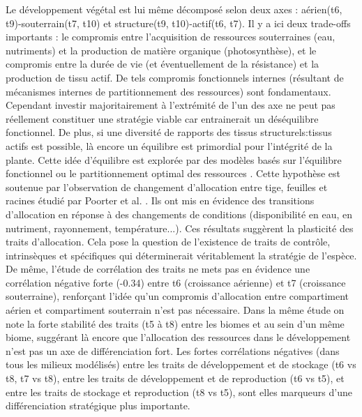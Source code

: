 \documentclass[french]{article}
\begin{document}
{Le développement végétal est lui même décomposé selon deux axes : aérien(t6, t9)-souterrain(t7, t10) et structure(t9, t10)-actif(t6, t7). Il y a ici deux trade-offs importants : le compromis entre l'acquisition de ressources souterraines (eau, nutriments) et la production de matière organique (photosynthèse), et le compromis entre la durée de vie (et éventuellement de la résistance) et la production de tissu actif. De tels compromis fonctionnels internes (résultant de mécanismes internes de partitionnement des ressources) sont fondamentaux. Cependant investir majoritairement à l'extrémité de l'un des axe ne peut pas réellement constituer une stratégie viable car entrainerait un déséquilibre fonctionnel. De plus, si une diversité de rapports des tissus structurels:tissus actifs est possible, là encore un équilibre est primordial pour l'intégrité de la plante. Cette idée d'équilibre est explorée par des modèles basés sur l'équilibre fonctionnel ou le partitionnement optimal des ressources \cite{Maire2009,Lohier2014}. Cette hypothèse est soutenue par l'observation de changement d'allocation entre tige, feuilles et racines étudié par Poorter et al. \cite{Poorter2012}. Ils ont mis en évidence des transitions d'allocation en réponse à des changements de conditions (disponibilité en eau, en nutriment, rayonnement, température...). Ces résultats suggèrent la plasticité des traits d'allocation. Cela pose la question de l'existence de traits de contrôle, intrinsèques et spécifiques qui déterminerait véritablement la stratégie de l'espèce. De même, l'étude de corrélation des traits \cite{Reu2010} ne mets pas en évidence une corrélation négative forte (-0.34) entre t6 (croissance aérienne) et t7 (croissance souterraine), renforçant l'idée qu'un compromis d'allocation entre compartiment aérien et compartiment souterrain n'est pas nécessaire. Dans la même étude on note la forte stabilité des traits (t5 à t8) entre les biomes et au sein d'un même biome, suggérant là encore que l'allocation des ressources dans le développement n'est pas un axe de différenciation fort. Les fortes corrélations négatives (dans tous les milieux modélisés) entre les traits de développement et de stockage (t6 vs t8, t7 vs t8), entre les traits de développement et de reproduction (t6 vs t5), et entre les traits de stockage et reproduction (t8 vs t5), sont elles marqueurs d'une différenciation stratégique plus importante.\\
}
\end{document}
